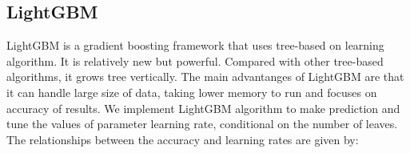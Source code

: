\documentclass[12pt]{article}
\begin{document}
\subsection{LightGBM}
LightGBM is a gradient boosting framework that uses tree-based on learning algorithm. It is relatively new but powerful. Compared with other tree-based algorithms, it grows tree vertically. The main advantanges of LightGBM are that it can handle large size of data, taking lower memory to run and focuses on accuracy of results. We implement LightGBM algorithm to make prediction and tune the values of parameter learning rate, conditional on the number of leaves. The relationships between the accuracy and learning rates are given by:
\begin{figure}[H]
\centering
{}
\end{figure}
\end{document}
